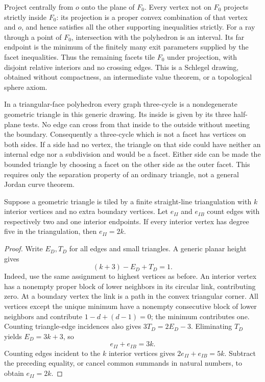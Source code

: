 Project centrally from $o$ onto the plane of $F_0$. Every vertex not on
$F_0$ projects strictly inside $F_0$: its projection is a proper convex combination
of that vertex and $o$, and hence satisfies all the other supporting
inequalities strictly. For a ray through a point of $F_0$, intersection
with the polyhedron is an interval. Its far endpoint is the minimum
of the finitely many exit parameters supplied by the facet inequalities.
Thus the remaining facets tile $F_0$ under projection, with disjoint
relative interiors and no crossing edges. This is a Schlegel drawing,
obtained without compactness, an intermediate value theorem, or a
topological sphere axiom.

In a triangular-face polyhedron every graph three-cycle is a
nondegenerate geometric triangle in this generic drawing. Its inside
is given by its three half-plane tests. No edge can cross from that
inside to the outside without meeting the boundary. Consequently a
three-cycle which is not a facet has vertices on both sides. If a
side had no vertex, the triangle on that side could have neither an
internal edge nor a subdivision and would be a facet. Either side
can be made the bounded triangle by choosing a facet on the other
side as the outer facet. This requires only the separation property
of an ordinary triangle, not a general Jordan curve theorem.

\begin{lemma}\label{lem:disk}
Suppose a geometric triangle is tiled by a finite straight-line
triangulation with $k$ interior vertices and no extra boundary vertices.
Let $e_{II}$ and $e_{IB}$ count edges with respectively two and one
interior endpoints. If every interior vertex has degree five in the
triangulation, then $e_{II}=2k$.
\end{lemma}
\begin{proof}
Write $E_D,T_D$ for all edges and small triangles. A generic planar
height gives
\[
 (k+3)-E_D+T_D=1.
\]
Indeed, use the same assignment to highest vertices as before.
An interior vertex has a nonempty proper block of lower neighbors
in its circular link, contributing zero. At a boundary vertex the
link is a path in the convex triangular corner. All vertices except
the unique minimum have a nonempty consecutive block of lower
neighbors and contribute $1-d+(d-1)=0$; the minimum contributes one.
Counting triangle-edge incidences also gives $3T_D=2E_D-3$.
Eliminating $T_D$ yields $E_D=3k+3$, so
\[
 e_{II}+e_{IB}=3k.
\]
Counting edges incident to the $k$ interior vertices gives
$2e_{II}+e_{IB}=5k$. Subtract the preceding equality, or cancel common
summands in natural numbers, to obtain $e_{II}=2k$.
\end{proof}

